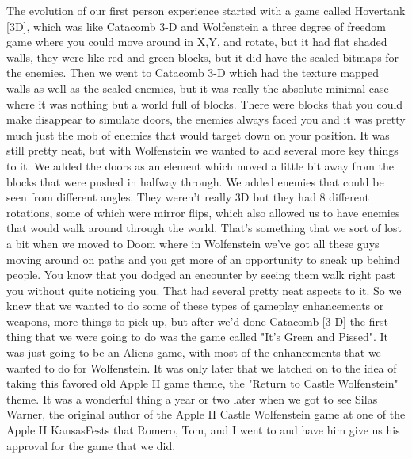 The evolution of our first person experience started with a game called Hovertank [3D], which was like Catacomb 3-D and Wolfenstein a three degree of freedom game where you could move around in X,Y, and rotate, but it had flat shaded walls, they were like red and green blocks, but it did have the scaled bitmaps for the enemies. Then we went to Catacomb 3-D which had the texture mapped walls as well as the scaled enemies, but it was really the absolute minimal case where it was nothing but a world full of blocks. There were blocks that you could make disappear to simulate doors, the enemies always faced you and it was pretty much just the mob of enemies that would target down on your position. It was still pretty neat, but with Wolfenstein we wanted to add several more key things to it. We added the doors as an element which moved a little bit away from the blocks that were pushed in halfway through. We added enemies that could be seen from different angles. They weren't really 3D but they had 8 different rotations, some of which were mirror flips, which also allowed us to have enemies that would walk around through the world. That's something that we sort of lost a bit when we moved to Doom where in Wolfenstein we've got all these guys moving around on paths and you get more of an opportunity to sneak up behind people. You know that you dodged an encounter by seeing them walk right past you without quite noticing you. That had several pretty neat aspects to it. So we knew that we wanted to do some of these types of gameplay enhancements or weapons, more things to pick up, but after we'd done Catacomb [3-D] the first thing that we were going to do was the game called "It's Green and Pissed". It was just going to be an Aliens game, with most of the enhancements that we wanted to do for Wolfenstein. It was only later that we latched on to the idea of taking this favored old Apple II game theme, the "Return to Castle Wolfenstein" theme. It was a wonderful thing a year or two later when we got to see Silas Warner, the original author of the Apple II Castle Wolfenstein game at one of the Apple II KansasFests that Romero, Tom, and I went to and have him give us his approval for the game that we did.\\ \par


